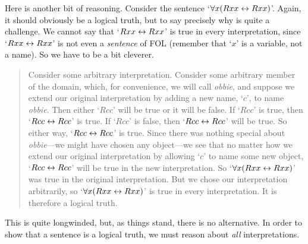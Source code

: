 Here is another bit of reasoning. Consider the sentence `$\forall x(Rxx\leftrightarrow Rxx)$'. Again, it should obviously be a logical truth, but to say precisely why is quite a challenge. We cannot say that `$Rxx \leftrightarrow Rxx$' is true in every interpretation, since `$Rxx \leftrightarrow Rxx$' is not even a \emph{sentence} of FOL (remember that `$x$' is a variable, not a name). So we have to be a bit cleverer. 
	\begin{quote}
		Consider some arbitrary interpretation. Consider some arbitrary member of the domain, which, for convenience, we will call \emph{obbie}, and suppose we extend our original interpretation by adding a new name, `$c$', to name \emph{obbie}. Then either `$Rcc$' will be true or it will be false. If `$Rcc$' is true, then `$Rcc \leftrightarrow Rcc$' is true. If `$Rcc$' is false, then `$Rcc \leftrightarrow Rcc$' will be true. So either way, `$Rcc \leftrightarrow Rcc$' is true. Since there was nothing special about \emph{obbie}---we might have chosen any object---we see that no matter how we extend our original interpretation by allowing `$c$' to name some new object, `$Rcc \leftrightarrow Rcc$' will be true in the new interpretation. So `$\forall x (Rxx \leftrightarrow Rxx)$' was true in the original interpretation. But we chose our interpretation arbitrarily, so `$\forall x (Rxx \leftrightarrow Rxx)$' is true in every interpretation. It is therefore a logical truth.
	\end{quote}
This is quite longwinded, but, as things stand, there is no alternative. In order to show that a sentence is a logical truth, we must reason about \emph{all} interpretations. 

